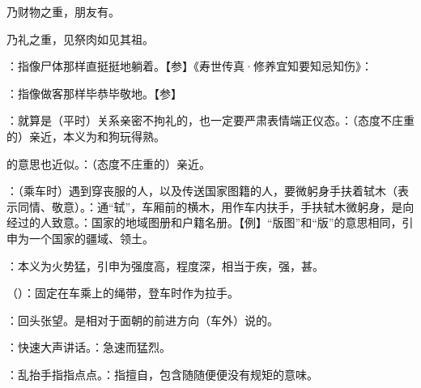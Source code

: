 {
\item {}乃财物之重，朋友有。

乃礼之重，见祭肉如见其祖。
}
{}


{
\item {}：指像尸体那样直挺挺地躺着。【参】《寿世传真·修养宜知要知忌知伤》：%
\item {}：指像做客那样毕恭毕敬地。【参】
}
{}


{
\item {}：就算是（平时）关系亲密不拘礼的，也一定要严肃表情端正仪态。：（态度不庄重的）亲近，本义为和狗玩得熟。

的意思也近似。：（态度不庄重的）亲近。
\item {}：（乘车时）遇到穿丧服的人，以及传送国家图籍的人，要微躬身手扶着轼木（表示同情、敬意）。：通“轼”，车厢前的横木，用作车内扶手，手扶轼木微躬身，是向经过的人致意。：国家的地域图册和户籍名册。【例】“版图”和“版”的意思相同，引申为一个国家的疆域、领土。
\item {}：本义为火势猛，引申为强度高，程度深，相当于疾，强，甚。
}
{}


{
\item {}（）：固定在车乘上的绳带，登车时作为拉手。
\item {}：回头张望。是相对于面朝的前进方向（车外）说的。
\item {}：快速大声讲话。：急速而猛烈。
\item {}：乱抬手指指点点。：指擅自，包含随随便便没有规矩的意味。
}
{}


